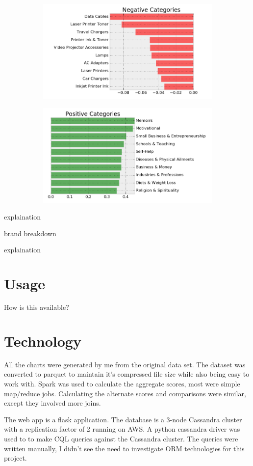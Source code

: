 \documentclass[a4paper,10pt]{article}
\begin{document}
\begin{figure}[H]
\centering
\begin{subfigure}{.5\textwidth}
  \centering
  \includegraphics[width=1\linewidth]{change_by_category_neg.png}
  \label{fig:sub1}
\end{subfigure}%
\begin{subfigure}{.5\textwidth}
  \centering
  \includegraphics[width=1\linewidth]{change_by_category_pos.png}
  \label{fig:sub2}
\end{subfigure}
\label{fig:test}
\end{figure}

explaination

brand breakdown

explaination

\section*{Usage}
How is this available?

\section*{Technology}
All the charts were generated by me from the original data set. The dataset was converted to parquet to maintain it's compressed file size while also being easy to work with. Spark was used to calculate the aggregate scores, most were simple map/reduce jobs. Calculating the alternate scores and comparisons were similar, except they involved more joins.

The web app is a flask application. The database is a 3-node Cassandra cluster with a replication factor of 2 running on AWS. A python cassandra driver was used to to make CQL queries against the Cassandra cluster. The queries were written manually, I didn't see the need to investigate ORM technologies for this project.
\end{document}
